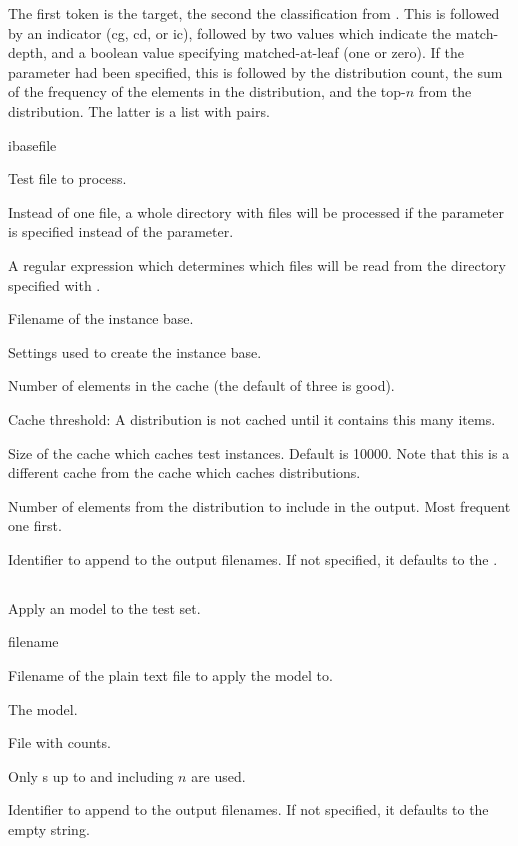 \documentclass[a4paper,10pt,twoside]{report}
\begin{document}
The first token is the target, the second the classification from
\Timbl{}. This is followed by an indicator (cg, cd, or ic), followed
by two values which indicate the match-depth, and a boolean value
specifying matched-at-leaf (one or zero). If the  parameter
had been specified, this is followed by the distribution count, the
sum of the frequency of the elements in the distribution, and the
top-$n$ from the distribution. The latter is a list with
 pairs.

\begin{varlist}{ibasefile}
\item[filename] Test file to process.
\item[dir] Instead of one file, a whole directory with files will be
  processed if the  parameter is specified instead of the
   parameter.
\item[dirmatch] A regular expression which determines which files will
  be read from the directory specified with .
\item[ibasefile] Filename of the instance base.
\item[timbl] Settings used to create the instance base.
\item[cache] Number of elements in the cache (the default of three is
  good). 
\item[cth] Cache threshold: A distribution is not cached until it
  contains this many items.
\item[cs] Size of the cache which caches test instances. Default is
  \num{10000}. Note that this is a different cache from the cache which
  caches distributions. 
\item[topn] Number of elements from the \Timbl{} distribution to
  include in the output. Most frequent one first.
\item[id] Identifier to append to the output filenames. If not
  specified, it defaults to the \pid{}.
\end{varlist}

\subsection{}

Apply an \ngram{} model to the test set.

\begin{varlist}{filename}
\item[filename] Filename of the plain text file to apply the model to.
\item[ngl] The \ngram{} model.
\item[counts] File with counts.
\item[n] Only \ngram{}s up to and including $n$ are used.
\item[id] Identifier to append to the output filenames. If not
  specified, it defaults to the empty string.
\end{varlist}
\end{document}
